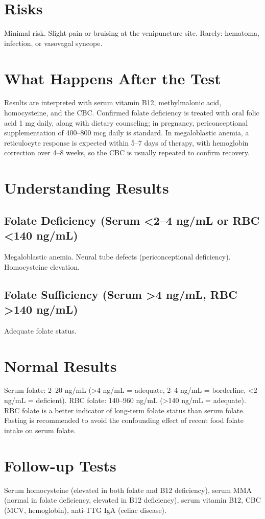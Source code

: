 \section*{Risks}
Minimal risk. Slight pain or bruising at the venipuncture site. Rarely: hematoma, infection, or vasovagal syncope.
\section*{What Happens After the Test}
Results are interpreted with serum vitamin B12, methylmalonic acid, homocysteine, and the CBC. Confirmed folate deficiency is treated with oral folic acid 1 mg daily, along with dietary counseling; in pregnancy, periconceptional supplementation of 400--800 mcg daily is standard. In megaloblastic anemia, a reticulocyte response is expected within 5--7 days of therapy, with hemoglobin correction over 4--8 weeks, so the CBC is usually repeated to confirm recovery.
\section*{Understanding Results}
\subsection*{Folate Deficiency (Serum <2--4 ng/mL or RBC <140 ng/mL)}
Megaloblastic anemia. Neural tube defects (periconceptional deficiency). Homocysteine elevation.
\subsection*{Folate Sufficiency (Serum >4 ng/mL, RBC >140 ng/mL)}
Adequate folate status.
\section*{Normal Results}
Serum folate: 2--20 ng/mL (>4 ng/mL = adequate, 2--4 ng/mL = borderline, <2 ng/mL = deficient). RBC folate: 140--960 ng/mL (>140 ng/mL = adequate). RBC folate is a better indicator of long-term folate status than serum folate. Fasting is recommended to avoid the confounding effect of recent food folate intake on serum folate.
\section*{Follow-up Tests}
Serum homocysteine (elevated in both folate and B12 deficiency), serum MMA (normal in folate deficiency, elevated in B12 deficiency), serum vitamin B12, CBC (MCV, hemoglobin), anti-TTG IgA (celiac disease).

